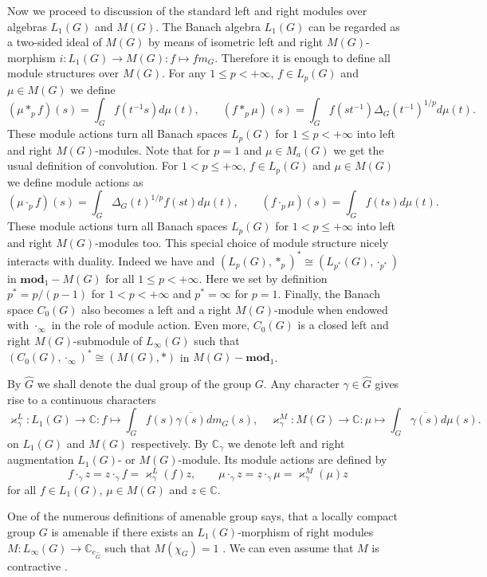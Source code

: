 \documentclass{article}
\theoremstyle{plain}
\theoremstyle{definition}
\newcommand{\convol}{\ast}
\newcommand{\isom}{\mathop{\mathbin{\cong}}}
\begin{document}
\begin{fulltext}
Now we proceed to discussion of the standard left and right modules over algebras 
$L_1(G)$ and $M(G)$. The Banach algebra $L_1(G)$ can be regarded as a two-sided 
ideal of $M(G)$ by means of isometric left and right $M(G)$-morphism 
$i:L_1(G)\to M(G):f\mapsto f m_G$. Therefore it is enough to define all module structures 
over $M(G)$. For any $1\leq p<+\infty$, $f\in L_p(G)$ and $\mu\in M(G)$ we define
\[
(\mu\convol_p f)(s)=\int_G f(t^{-1}s)d\mu(t),
\qquad
(f\convol_p \mu)(s)=\int_G f(st^{-1})\Delta_G(t^{-1})^{1/p}d\mu(t).
\]
These module actions turn all Banach spaces $L_p(G)$ for $1\leq p<+\infty$ into left 
and right $M(G)$-modules. Note that for $p=1$ and $\mu\in M_a(G)$ we get the usual 
definition of convolution. For $1<p\leq +\infty$, $f\in L_p(G)$ and $\mu\in M(G)$ we 
define module actions as
\[
(\mu\cdot_p f)(s)=\int_G \Delta_G(t)^{1/p}f(st)d\mu(t),
\qquad
(f\cdot_p \mu)(s)=\int_G f(ts)d\mu(t).
\]
These module actions turn all Banach spaces $L_p(G)$ for $1<p\leq+\infty$ into left 
and right $M(G)$-modules too. This special choice of module structure nicely interacts 
with duality. Indeed we have and $(L_p(G),\convol_p)^*\isom (L_{p^*}(G),\cdot_{p^*})$ 
in $\mathbf{mod}_1-M(G)$ for all $1\leq p<+\infty$. Here we set by definition 
$p^*=p/(p-1)$ for $1<p<+\infty$ and $p^*=\infty$ for $p=1$. Finally, the Banach space $C_0(G)$ 
also becomes a left and a right $M(G)$-module when endowed with $\cdot_\infty$ in the 
role of module action. Even more, $C_0(G)$ is a closed left and right $M(G)$-submodule of 
$L_\infty(G)$ such that $(C_0(G),\cdot_\infty)^*\isom (M(G),\convol)$ in 
$M(G)-\mathbf{mod}_1$.

By $\widehat{G}$ we shall denote the dual group of the group $G$. Any character 
$\gamma\in\widehat{G}$ gives rise to a continuous characters  
\[
\varkappa_\gamma^L:L_1(G)\to\mathbb{C}:f\mapsto \int_G f(s)\overline{\gamma(s)}d m_G(s),
\quad
\varkappa_\gamma^M:M(G)\to\mathbb{C}:\mu\mapsto\int_{G} \overline{\gamma(s)}d\mu(s).
\]
on $L_1(G)$ and $M(G)$ respectively. By $\mathbb{C}_\gamma$ we denote left and right 
augmentation $L_1(G)$- or $M(G)$-module. Its module actions are defined by
\[
f\cdot_{\gamma}z=z\cdot_{\gamma}f=\varkappa_\gamma^L(f)z,
\qquad
\mu\cdot_{\gamma}z=z\cdot_{\gamma}\mu=\varkappa_\gamma^M(\mu)z
\]
for all $f\in L_1(G)$, $\mu\in M(G)$ and $z\in\mathbb{C}$. 

One of the numerous definitions of amenable group says, that a locally compact group $G$ 
is amenable if there exists an $L_1(G)$-morphism of right modules 
$M:L_\infty(G)\to\mathbb{C}_{e_{\widehat{G}}}$ such that $M(\chi_G)=1$ 
\cite[section 7.2.5]{HelBanLocConvAlg}. We can even assume that $M$ is contractive 
\cite[remark 7.1.54]{HelBanLocConvAlg}.


\end{fulltext}
\end{document}
